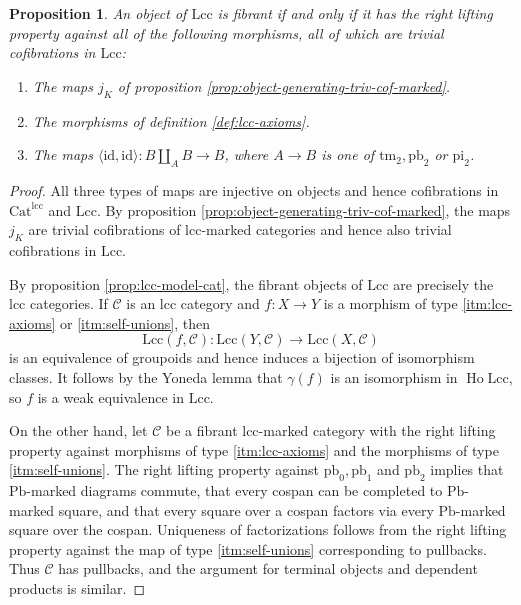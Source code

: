 \documentclass[a4paper]{article}
\newtheorem{proposition}[theorem]{Proposition}
\theoremstyle{remark}
\theoremstyle{definition}
\begin{document}
\begin{proposition}
  \label{prop:object-generating-triv-cof-lcc}
  An object of $\mathrm{Lcc}$ is fibrant if and only if it has the right lifting property against all of the following morphisms, all of which are trivial cofibrations in $\mathrm{Lcc}$:
  \begin{enumerate}
    \item
      \label{itm:marking-stability}
      The maps $j_K$ of proposition \ref{prop:object-generating-triv-cof-marked}.
    \item
      \label{itm:lcc-axioms}
      The morphisms of definition \ref{def:lcc-axioms}.
    \item
      \label{itm:self-unions}
      The maps $\langle \mathrm{id}, \mathrm{id} \rangle : B \amalg_A B \rightarrow B$, where $A \rightarrow B$  is one of $\mathrm{tm}_2, \mathrm{pb}_2$ or $\mathrm{pi}_2$.
  \end{enumerate}
\end{proposition}
\begin{proof}
  All three types of maps are injective on objects and hence cofibrations in $\mathrm{Cat}^{\mathrm{lcc}}$ and $\mathrm{Lcc}$.
  By proposition \ref{prop:object-generating-triv-cof-marked}, the maps $j_K$ are trivial cofibrations of lcc-marked categories and hence also trivial cofibrations in $\mathrm{Lcc}$.

  By proposition \ref{prop:lcc-model-cat}, the fibrant objects of $\mathrm{Lcc}$ are precisely the lcc categories. 
  If $\mathcal{C}$ is an lcc category and $f : X \rightarrow Y$ is a morphism of type \ref{itm:lcc-axioms} or \ref{itm:self-unions}, then 
  \begin{equation}
    \mathrm{Lcc}(f, \mathcal{C}) : \mathrm{Lcc}(Y, \mathcal{C}) \rightarrow \mathrm{Lcc}(X, \mathcal{C})
  \end{equation}
  is an equivalence of groupoids and hence induces a bijection of isomorphism classes.
  It follows by the Yoneda lemma that $\gamma(f)$ is an isomorphism in $\operatorname{Ho} \mathrm{Lcc}$, so $f$ is  a weak equivalence in $\mathrm{Lcc}$.

  On the other hand, let $\mathcal{C}$ be a fibrant lcc-marked category with the right lifting property against morphisms of type \ref{itm:lcc-axioms} and the morphisms of type \ref{itm:self-unions}.
  The right lifting property against $\mathrm{pb}_0, \mathrm{pb}_1$ and $\mathrm{pb}_2$ implies that $\mathrm{Pb}$-marked diagrams commute, that every cospan can be completed to $\mathrm{Pb}$-marked square, and that every square over a cospan factors via every $\mathrm{Pb}$-marked square over the cospan.
  Uniqueness of factorizations follows from the right lifting property against the map of type \ref{itm:self-unions} corresponding to pullbacks.
  Thus $\mathcal{C}$ has pullbacks, and the argument for terminal objects and dependent products is similar.
\end{proof}
\end{document}
